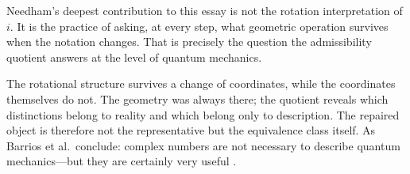 \documentclass[12pt]{article}
\begin{document}
Needham's deepest contribution to this essay is not the rotation interpretation of $i$. It is the practice of asking, at every step, what geometric operation survives when the notation changes. That is precisely the question the admissibility quotient answers at the level of quantum mechanics.

The rotational structure survives a change of coordinates, while the coordinates themselves do not. The geometry was always there; the quotient reveals which distinctions belong to reality and which belong only to description. The repaired object is therefore not the representative but the equivalence class itself. As Barrios et al.\ conclude: complex numbers are not necessary to describe quantum mechanics---but they are certainly very useful \cite{Barrios}.

\end{document}
